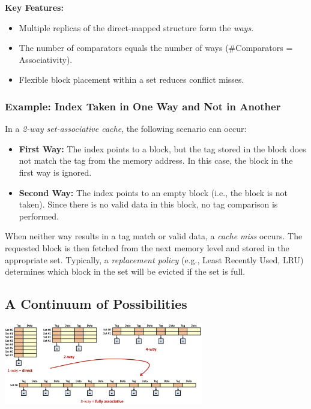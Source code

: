 \textbf{Key Features:}
\begin{itemize}
    \item Multiple replicas of the direct-mapped structure form the \textit{ways}.
    \item The number of comparators equals the number of ways (\#Comparators = Associativity).
    \item Flexible block placement within a set reduces conflict misses.
\end{itemize}

\subsubsection*{Example: Index Taken in One Way and Not in Another}
In a \textit{2-way set-associative cache}, the following scenario can occur:
\begin{itemize}
    \item \textbf{First Way:} The index points to a block, but the tag stored in the block does not match the tag from the memory address. In this case, the block in the first way is ignored.
    \item \textbf{Second Way:} The index points to an empty block (i.e., the block is not taken). Since there is no valid data in this block, no tag comparison is performed.
\end{itemize}

When neither way results in a tag match or valid data, a \textit{cache miss} occurs. The requested block is then fetched from the next memory level and stored in the appropriate set. Typically, a \textit{replacement policy} (e.g., Least Recently Used, LRU) determines which block in the set will be evicted if the set is full.

\subsection{A Continuum of Possibilities}
\begin{center}
    \includegraphics[width=0.65\textwidth]{chapters/chapter3a/images/posib.png}
\end{center}

